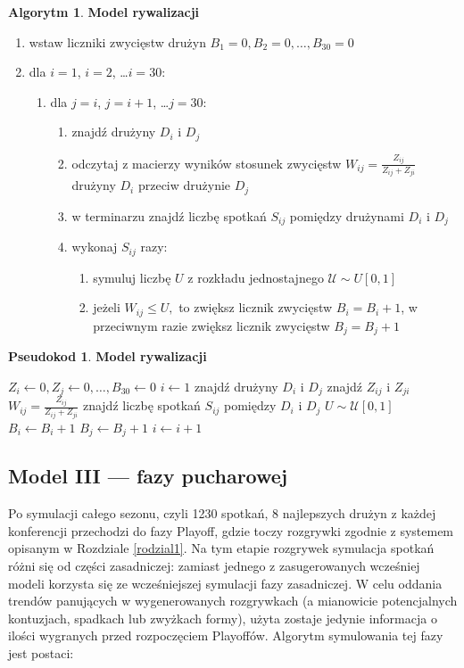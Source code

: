 \documentclass[inzynierska]{pwr_wmat_praca_dyplomowa}
\theoremstyle{plain}
\numberwithin{theorem}{chapter}
\theoremstyle{definition}
\numberwithin{theorem}{chapter}
\newtheorem{algorytm}[theorem]{Algorytm}
\newtheorem{pseudokod}[theorem]{Pseudokod}
\begin{document}
\begin{algorytm} \textbf{Model rywalizacji}
	\begin{enumerate}
		\item wstaw liczniki zwycięstw drużyn $B_1= 0,B_2= 0,\dots, B_{30}= 0$
		\item dla $i=1$, $i=2$, \dots $i=30$: 
		\begin{enumerate}
			\item dla $j=i$, $j=i+1$, \dots $j=30$: 
			\begin{enumerate}
				\item znajdź drużyny $D_i$ i $D_j$
				\item odczytaj z macierzy wyników stosunek zwycięstw $W_{ij}=\frac{Z_{ij}}{Z_{ij}+Z_{ji}}$ drużyny $D_i$ przeciw drużynie $D_j$   
				\item w terminarzu znajdź liczbę spotkań $S_{ij}$ pomiędzy drużynami $D_i$ i $D_j$
				\item wykonaj $S_{ij}$ razy:
				\begin{enumerate}
					\item symuluj liczbę $U$ z rozkładu jednostajnego $\mathcal{U}\sim U[0,1]$ 
					\item jeżeli $W_{ij} \leq U,$ to zwiększ licznik zwycięstw $B_i=B_i+1$, w przeciwnym razie zwiększ licznik zwycięstw $B_j=B_j+1$
				\end{enumerate}
			\end{enumerate}
		\end{enumerate}
	\end{enumerate}
\end{algorytm} 

\begin{pseudokod} 
	\textbf{Model rywalizacji}
	\begin{algorithmic}[1]
		\State $Z_i\gets 0,Z_j\gets 0,\dots, B_{30}\gets 0$
		\State $i\gets 1$
		\State znajdź drużyny $D_i$ i $D_j$
		\State znajdź $Z_{ij}$ i $Z_{ji}$ 
		\State $W_{ij}=\frac{Z_{ij}}{Z_{ij}+Z_{ji}}$
		\State znajdź liczbę spotkań $S_{ij}$ pomiędzy $D_i$ i $D_j$
		\State $U\sim \mathcal{U}[0,1]$
		\State $B_i \gets B_i+1$
		\Else
		\State $B_j \gets B_j+1$
		\EndIf
		\EndFor
		\EndFor
		\State $i\gets i+1$
		\EndWhile
	\end{algorithmic}
\end{pseudokod}

\subsection{Model III --- fazy pucharowej}
Po symulacji całego sezonu, czyli 1230 spotkań, 8 najlepszych drużyn z każdej konferencji przechodzi do fazy Playoff, gdzie toczy rozgrywki zgodnie z systemem opisanym w Rozdziale \ref{rodzial1}. Na tym etapie rozgrywek symulacja spotkań różni się od części zasadniczej: zamiast jednego z zasugerowanych wcześniej modeli korzysta się ze wcześniejszej symulacji fazy zasadniczej. W celu oddania trendów panujących w wygenerowanych rozgrywkach (a mianowicie potencjalnych kontuzjach, spadkach lub zwyżkach formy), użyta zostaje jedynie informacja o ilości wygranych przed rozpoczęciem Playoffów. Algorytm symulowania tej fazy jest postaci: 
\end{document}
